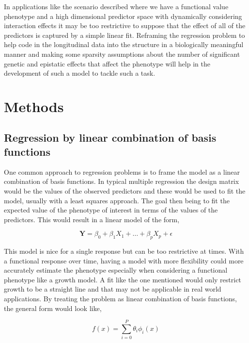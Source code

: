 \documentclass[11pt,]{book}
\theoremstyle{definition}
\theoremstyle{definition}
\theoremstyle{remark}
\begin{document}
In applications like the scenario described where we have a functional
value phenotype and a high dimensional predictor space with dynamically
considering interaction effects it may be too restrictive to suppose
that the effect of all of the predictors is captured by a simple linear
fit. Reframing the regression problem to help code in the longitudinal
data into the structure in a biologically meaningful manner and making
some sparsity assumptions about the number of significant genetic and
epistatic effects that affect the phenotype will help in the development
of such a model to tackle such a task.

\section{Methods}\label{methods-2}

\subsection{Regression by linear combination of basis
functions}\label{regression-by-linear-combination-of-basis-functions}

One common approach to regression problems is to frame the model as a
linear combination of basis functions. In typical multiple regression
the design matrix would be the values of the observed predictors and
these would be used to fit the model, usually with a least squares
approach. The goal then being to fit the expected value of the phenotype
of interest in terms of the values of the predictors. This would result
in a linear model of the form,

\begin{equation}
\mathbf{Y} = \beta_0 + \beta_1 X_1 + \dots + \beta_p X_p + \epsilon
\label{eq:lin-mod}
\end{equation}

This model is nice for a single response but can be too restrictive at
times. With a functional response over time, having a model with more
flexibility could more accurately estimate the phenotype especially when
considering a functional phenotype like a growth model. A fit like the
one mentioned would only restrict growth to be a straight line and that
may not be applicable in real world applications. By treating the
problem as linear combination of basis functions, the general form would
look like,

\begin{equation}
f(x) = \sum_{i=0}^P \theta_i \phi_i(x)
\label{eq:gen-form}
\end{equation}
\end{document}
